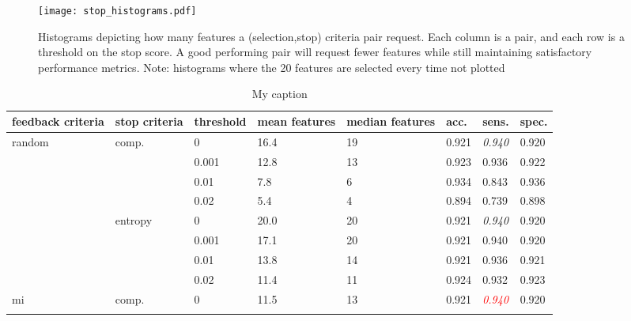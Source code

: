 \begin{figure}[h]
	\centering
	\texttt{[image: stop\_histograms.pdf]}
	\caption{Histograms depicting how many features a (selection,stop) criteria pair request. Each column is a pair, and each row is a threshold on the stop score. A good performing pair will request fewer features while still maintaining satisfactory performance metrics. Note: histograms where the 20 features are selected every time not plotted}
	\label{fig:feedback_stop_histograms}
\end{figure}


\begin{table}[]
	\centering
	\caption{My caption}
	\label{my-label}
	\begin{tabularx}{\textwidth}{|X|X|X|X|X|X|X|X|}
		\hline
		feedback criteria        & stop criteria            & threshold & mean features & median features  & acc.           & sens.                & spec.          \\ \hline
		\multirow{8}{*}{random}  & \multirow{4}{*}{comp.}   & 0         & 16.4          & 19               & 0.921          & \textit{0.940}       & 0.920          \\ \cline{3-8} 
		&                          & 0.001     & 12.8          & 13               & 0.923          & 0.936                & 0.922          \\ \cline{3-8} 
		&                          & 0.01      & 7.8           & 6                & 0.934          & 0.843                & 0.936          \\ \cline{3-8} 
		&                          & 0.02      & 5.4           & 4                & 0.894          & 0.739                & 0.898          \\ \cline{2-8} 
		& \multirow{4}{*}{entropy} & 0         & 20.0          & 20               & 0.921          & \textit{0.940}       & 0.920          \\ \cline{3-8} 
		&                          & 0.001     & 17.1          & 20               & 0.921          & 0.940                & 0.920          \\ \cline{3-8} 
		&                          & 0.01      & 13.8          & 14               & 0.921          & 0.936                & 0.921          \\ \cline{3-8} 
		&                          & 0.02      & 11.4          & 11               & 0.924          & 0.932                & 0.923          \\ \hline
		\multirow{8}{*}{mi}      & \multirow{4}{*}{comp.}   & 0         & 11.5          & 13               & 0.921          & \textcolor{red}{\textit{0.940}} & 0.920          \\ \cline{3-8} 

\end{tabularx}
\end{table}
